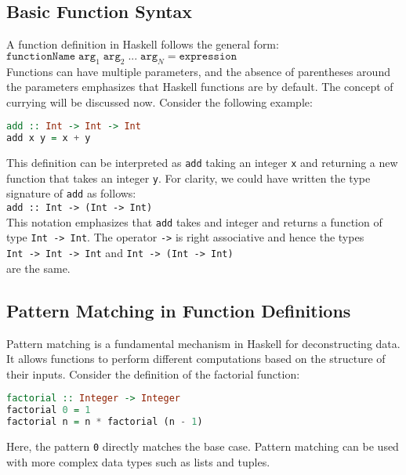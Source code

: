 \subsection{Basic Function Syntax}
A function definition in Haskell follows the general form:
\\[0.2cm]
\hspace*{1.3cm}
$\texttt{functionName} \;\mathtt{arg}_1 \;\mathtt{arg}_2\; ... \;\mathtt{arg}_N = \mathtt{expression}$
\\[0.2cm]
Functions can have multiple parameters, and the absence of parentheses around the parameters emphasizes that
Haskell functions are  by default.  The concept of currying will be discussed now.
Consider the following example: 
\begin{lstlisting}[style=haskellstyle, language=Haskell]
add :: Int -> Int -> Int 
add x y = x + y 
\end{lstlisting}
This definition can be interpreted as \texttt{add} taking an integer \texttt{x} and returning a new
function that takes an integer \texttt{y}.   For clarity, we could have written the type signature of
\texttt{add} as follows:
\\[0.2cm]
\hspace*{1.3cm}
\texttt{add :: Int -> (Int -> Int)}
\\[0.2cm]
This notation emphasizes that \texttt{add} takes and integer and returns a function of type \texttt{Int -> Int}.
The operator \texttt{->} is right associative and hence the types
\\[0.2cm]
\hspace*{1.3cm}
\texttt{Int -> Int -> Int} \quad and \quad \texttt{Int -> (Int -> Int)}
\\[0.2cm]
are the same.


\subsection{Pattern Matching in Function Definitions}
Pattern matching is a fundamental mechanism in Haskell for deconstructing data. It allows functions to perform
different computations based on the structure of their inputs. Consider the definition of the factorial
function: 
\begin{lstlisting}[style=haskellstyle, language=Haskell]
factorial :: Integer -> Integer
factorial 0 = 1
factorial n = n * factorial (n - 1)
\end{lstlisting}
Here, the pattern \texttt{0} directly matches the base case. Pattern matching can be used with more complex data types such as lists and tuples.

